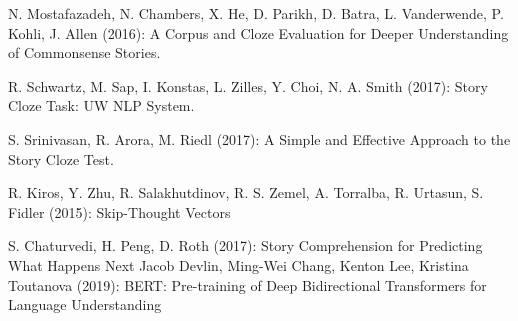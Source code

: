 \documentclass{article}
\begin{document}
\begin{thebibliography}{}
 
 N. Mostafazadeh, N. Chambers, X. He, D. Parikh, D. Batra, L. Vanderwende, P. Kohli, J. Allen (2016): A Corpus and Cloze Evaluation for Deeper Understanding of Commonsense Stories.

 R. Schwartz, M. Sap, I. Konstas, L. Zilles, Y. Choi, N. A. Smith (2017): Story Cloze Task: UW NLP System.

 S. Srinivasan, R. Arora, M. Riedl (2017): A Simple and Effective Approach to the Story Cloze Test.

 R. Kiros, Y. Zhu, R. Salakhutdinov, R. S. Zemel, A. Torralba, R. Urtasun, S. Fidler (2015): Skip-Thought Vectors

 S. Chaturvedi, H. Peng, D. Roth (2017): Story Comprehension for Predicting What Happens Next
 Jacob Devlin, Ming-Wei Chang, Kenton Lee, Kristina Toutanova (2019): BERT: Pre-training of Deep Bidirectional Transformers for
Language Understanding

\end{thebibliography}
\end{document}
